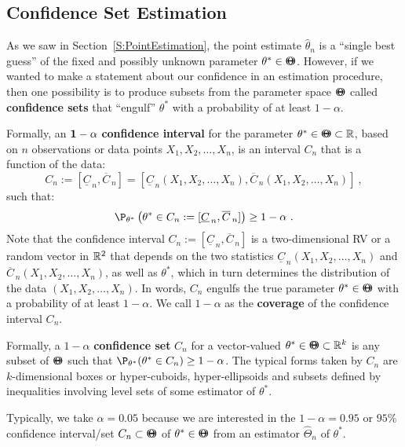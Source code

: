 \subsection{Confidence Set Estimation}\label{S:ConfidenceSets}
As we saw in Section~\ref*{S:PointEstimation}, the point estimate $\widehat{\theta}_n$ is a ``single best guess'' of  the fixed and possibly unknown parameter $\theta^* \in {\Theta}\mspace{-11 mu}{\Theta}$.  However, if we wanted to make a statement about our confidence in an estimation procedure, then one possibility is to produce subsets from the parameter space ${\Theta}\mspace{-11 mu}{\Theta}$ called {\bf confidence sets} that ``engulf'' $\theta^*$ with a probability of at least $1-\alpha$.  

Formally, an $\mathbf{1-\alpha}$ {\bf confidence interval} for the parameter $\theta^* \in {\Theta}\mspace{-11 mu}{\Theta} \subset \mathbb{R}$, based on $n$ observations or data points $X_1,X_2,\ldots,X_n$, is an interval $C_n$ that is a function of the data:
\[
C_n := [\underline{C}_{\, n}, \overline{C}_{\, n}]
= [\underline{C}_{\, n}(X_1,X_2,\ldots,X_n), \overline{C}_{\, n}(X_1,X_2,\ldots,X_n)] \ ,
\]
such that:
\[
\P_{\theta^*} \left(  \theta^* \in C_n :=  [\underline{C}_{\, n}, \overline{C}_{\, n}] \right) \geq 1-\alpha \ .
\]
Note that the confidence interval $C_n := [\underline{C}_{\, n}, \overline{C}_{\, n}]$ is a two-dimensional RV or a random vector in $\mathbb{R}^2$ that depends on the two statistics $\underline{C}_{\, n} (X_1,X_2,\ldots,X_n) $ and $\overline{C}_{\, n} (X_1,X_2,\ldots,X_n) $, as well as $\theta^*$, which in turn determines the distribution of the data $(X_1,X_2,\ldots,X_n)$.  In words, $C_n$ engulfs the true parameter $\theta^* \in {\Theta}\mspace{-11 mu}{\Theta}$ with a probability of at least $1-\alpha$.  We call $1-\alpha$ as the {\bf coverage} of the confidence interval $C_n$.

Formally, a $1-\alpha$ {\bf confidence set} $C_n$ for a vector-valued $\theta^* \in {\Theta}\mspace{-11 mu}{\Theta} \subset \mathbb{R}^k$ is any subset of ${\Theta}\mspace{-11 mu}{\Theta}$ such that $\P_{\theta^*}( \theta^* \in C_n) \geq 1-\alpha$.  The typical forms taken by $C_n$ are $k$-dimensional boxes or hyper-cuboids, hyper-ellipsoids and subsets defined by inequalities involving level sets of some estimator of $\theta^*$.  

Typically, we take $\alpha=0.05$ because we are interested in the $1-\alpha=0.95$ or $95\%$ confidence interval/set $C_n \subset {\Theta}\mspace{-11 mu}{\Theta}$ of $\theta^* \in {\Theta}\mspace{-11 mu}{\Theta}$ from an estimator $\widehat{\Theta}_n$ of $\theta^*$.  

